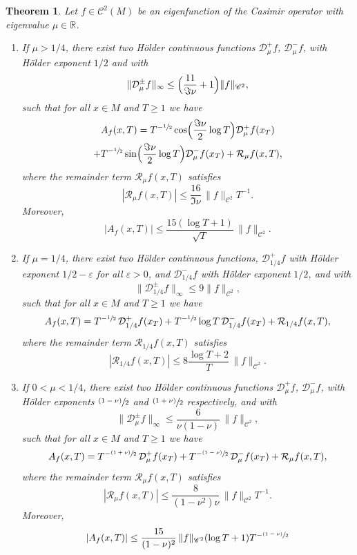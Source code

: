 \documentclass[11pt]{article}
\newenvironment{enumeratei}
{\bgroup\def\theenumi{\roman{enumi}}\def\theenumii{\arabic{enumii}}\begin{enumerate}}
{\end{enumerate}\egroup}
\newcommand{\psfrac}[2]{\sfrac{(#1)}{#2}}
\newcommand \R{\mathbb{R}}
\newcommand{\Dp}[1]{\mathcal{D}_\mu^{+} #1}
\newcommand{\Dm}[1]{\mathcal{D}_\mu^{-} #1}
\newcommand{\Dpm}[1]{\mathcal{D}_\mu^{\pm} #1}
\newcommand{\RxT}{\mathcal{R}_\mu f(x,T)}
\newcommand{\aver}[1]{A_{#1}(x,T)}
\newtheorem{theorem}{Theorem}
\theoremstyle{definition}
\begin{document}
\begin{theorem}\label{thm:main1}
Let $f \in \mathscr{C}^2(M)$ be an eigenfunction of the Casimir operator with eigenvalue $\mu \in \R$.
\begin{enumeratei}
\item\label{thm:main1i}
If $\mu > 1/4$, there exist two Hölder continuous functions $\Dp{f}$, $\Dm{f}$, with Hölder exponent $1/2$ and with
\[
\|\Dpm{f} \|_{\infty} \leq \Bigl(\frac{11}{\Im \nu} + 1 \Bigr) \|f\|_{\mathscr{C}^2},
\]
such that for all $x \in M$ and $T \geq 1$ we have
\begin{multline*}
\aver{f} = T^{-\sfrac{1}{2}} \cos\Bigl(\frac{\Im \nu}{2} \log T \Bigr) \Dp{ f(x_T)}\\
+ T^{-\sfrac{1}{2}} \sin\Bigl(\frac{\Im \nu}{2} \log T \Bigr) \Dm{ f(x_T)}+ \RxT,
\end{multline*}
where the remainder term $\RxT$ satisfies
\[
|\RxT|\leq \frac{16}{\Im \nu}\, \|f\|_{\mathscr{C}^2} T^{-1}.
\]
Moreover,
\begin{equation}\label{eq:aux_thm_1_princ}
|\aver{f}|\leq \frac{15(\log T +1)}{\sqrt{T}}\, \|f\|_{\mathscr{C}^2}.
\end{equation}

\item\label{thm:main1ii}
If $\mu = 1/4$, there exist two Hölder continuous functions, $\mathcal{D}^{+}_{1/4}f$ with Hölder exponent $1/2 - \varepsilon$ for all $\varepsilon >0$, and $\mathcal{D}^{-}_{1/4}f$ with Hölder exponent $1/2$, and with
\[
\|\mathcal{D}^{\pm}_{1/4}f \|_{\infty} \leq 9 \|f\|_{\mathscr{C}^2},
\]
such that for all $x \in M$ and $T \geq 1$ we have
\[
\aver{f} = T^{-\sfrac{1}{2}} \, \mathcal{D}^{+}_{1/4} f(x_T) + T^{-\sfrac{1}{2}} \log T \, \mathcal{D}^{-}_{1/4} f(x_T) +\mathcal{R}_{1/4}f(x,T),
\]
where the remainder term $\mathcal{R}_{1/4}f(x,T)$ satisfies
\[
|\mathcal{R}_{1/4}f(x,T)|\leq 8 \frac{\log T +2}{T}\, \|f\|_{\mathscr{C}^2}.
\]

\item\label{thm:main1iii}
If $0< \mu < 1/4$, there exist two Hölder continuous functions $\Dp{f}$, $\Dm{f}$, with Hölder exponents $\psfrac{1-\nu}{2} $ and $\psfrac{1+\nu}{2} $ respectively, and with
\[
\|\Dpm{f} \|_{\infty} \leq \frac{6}{\nu(1-\nu)}\, \|f\|_{\mathscr{C}^2},
\]
such that for all $x \in M$ and $T \geq 1$ we have
\[
\aver{f} = T^{-\psfrac{1+\nu}{2}} \, \Dp{f(x_T) } + T^{-\psfrac{1-\nu}{2}} \, \Dm{ f(x_T)} + \RxT,
\]
where the remainder term $\RxT$ satisfies
\[
|\RxT|\leq \frac{8}{(1-\nu^2) \nu}\, \|f\|_{\mathscr{C}^2} T^{-1}.
\]
Moreover,
\begin{equation}\label{eq:aux_thm_1_comp}
|\aver{f}|\leq \frac{15}{(1-\nu)^2}\, \|f\|_{\mathscr{C}^2} (\log T +1) T^{-\psfrac{1-\nu}{2}}
\end{equation}


\end{enumeratei}
\end{theorem}
\end{document}
